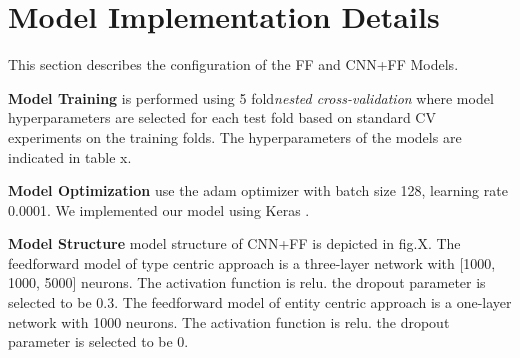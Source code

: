 \section{Model Implementation Details}
This section describes the configuration of the FF and CNN+FF Models.

\textbf{Model Training} is performed using 5 fold\textit{nested cross-validation} \cite{cawley2010over} where model hyperparameters are selected for each test fold based on standard CV experiments on the training folds. The hyperparameters of the models are indicated in table x.

\textbf{Model Optimization} use the adam optimizer with batch size 128, learning rate 0.0001. We implemented our model using Keras \cite{chollet2015keras}.

\textbf{Model Structure} model structure of CNN+FF is depicted in fig.X. The feedforward model of type centric approach is a three-layer network with [1000, 1000, 5000] neurons. The activation function is relu. the dropout parameter is selected to be 0.3. The feedforward model of entity centric approach is a one-layer network with 1000 neurons. The activation function is relu. the dropout parameter is selected to be 0.
